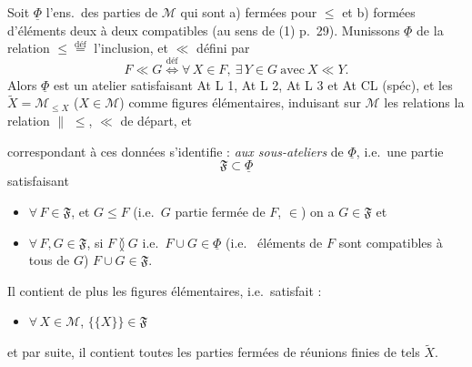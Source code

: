 \documentclass[11pt,a4paper]{article}
\begin{document}
Soit \struck{\ill{}} $\underline{\Phi}$ l'ens.\ des parties de $\mathcal{M}$ qui sont a) fermées pour $\leq$ et b) formées d'éléments deux à deux compatibles (au sens de (1) p.~29). Munissons $\underline{\Phi}$ de la relation $\leq \overset{\mathrm{déf}}{=}$ l'inclusion, et $\ll$ défini par
\[
  F \ll G \overset{\mathrm{déf}}{\iff} \forall\, X \in F,\ \exists\, Y \in G \ \text{avec}\ X \ll Y .
\]
Alors $\underline{\Phi}$ est un atelier \struck{\ill{}} satisfaisant  At L 1, At L 2, At L 3 et At CL (spéc), et \ill{} les $\widetilde{X} = \mathcal{M}_{\leq X}$ \struck{\ill{}} ($X \in \mathcal{M}$) comme  figures élémentaires,  \ill{} induisant sur $\mathcal{M}$ les relations  \struck{\ill{}}  la relation $\parallel$ \struck{\ill{}} $\leq$, $\ll$ de départ, et \ill{}

  correspondant à ces \struck{\ill{}} données s'identifie : \emph{aux sous-ateliers } de $\underline{\Phi}$,   i.e.\ une partie
\[
  \mathfrak{F} \subset \underline{\Phi}
\]
satisfaisant
\begin{itemize}
  \item[(i)] $\forall\, F \in \mathfrak{F}$, et $G \leq F$ \struck{\ill{}} (i.e.\ $G$ partie fermée de $F$, $\in$) on a $G \in \mathfrak{F}$ et
  \item[(ii)] $\forall\, F, G \in \mathfrak{F}$, si $F \between G$ i.e.\ $F \cup G \in \underline{\Phi}$ (i.e.\ \struck{\ill{}} éléments de $F$ sont compatibles à tous  de $G$) $F \cup G \in \mathfrak{F}$.
\end{itemize}

Il contient de plus les  figures élémentaires, i.e.\ satisfait :
\begin{itemize}
  \item[(iii)] $\forall\, X \in \mathcal{M}$, $\lbrace\lbrace X \rbrace\rbrace \in \mathfrak{F}$
\end{itemize}
et par suite, il contient toutes les parties fermées de réunions finies de tels $\widetilde{X}$.
\end{document}
